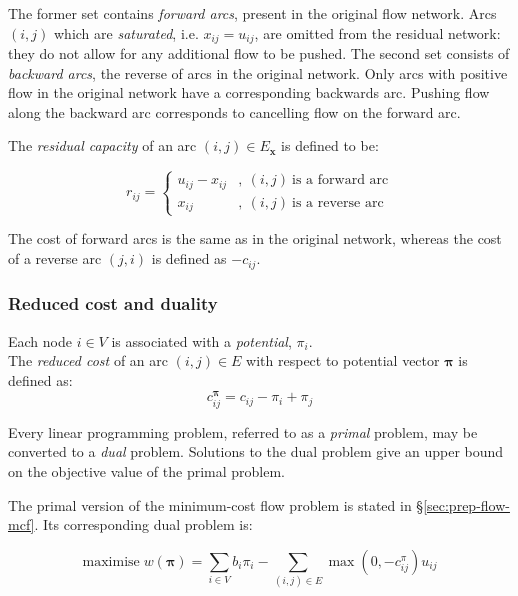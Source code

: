 The former set contains \emph{forward arcs}, present in the original flow network. Arcs $(i,j)$ which are \emph{saturated}, i.e. $x_{ij}=u_{ij}$, are omitted from the residual network: they do not allow for any additional flow to be pushed. The second set consists of \emph{backward arcs}, the reverse of arcs in the original network. Only arcs with positive flow in the original network have a corresponding backwards arc. Pushing flow along the backward arc corresponds to cancelling flow on the forward arc.

The \emph{residual capacity} of an arc $(i,j)\in E_{\mathbf{x}}$ is defined to be:

\begin{equation}
r_{ij}=\begin{cases}
u_{ij}-x_{ij} & ,\:(i,j)\:\mbox{is a forward arc}\\
x_{ij} & ,\:(i,j)\:\mbox{is a reverse arc}
\end{cases}
\end{equation}

The cost of forward arcs is the same as in the original network, whereas the cost of a reverse arc $(j,i)$ is defined as $-c_{ij}$.

\subsubsection{Reduced cost and duality} \label{sec:prep-flow-rc-and-dual}


Each node $i\in V$ is associated with a \emph{potential}, $\pi_{i}$.\\

The \emph{reduced cost} of an arc $(i,j)\in E$ with respect to potential vector $\boldsymbol{\pi}$ is defined as:
\begin{equation} \label{eq:reduced-costs}
c_{ij}^{\boldsymbol{\pi}}=c_{ij}-\pi_{i}+\pi_{j}
\end{equation}

Every linear programming problem, referred to as a \emph{primal} problem, may be converted to a \emph{dual} problem. Solutions to the dual problem give an upper bound on the objective value of the primal problem.

The primal version of the minimum-cost flow problem is stated in \S\ref{sec:prep-flow-mcf}. Its corresponding dual problem is:

\begin{equation}
\mathrm{maximise}\; w(\boldsymbol{\pi})=\sum_{i\in V}b_{i}\pi_{i}-\sum_{(i,j)\in E}\max\left(0,-c_{ij}^{\pi}\right)u_{ij}
\end{equation}

